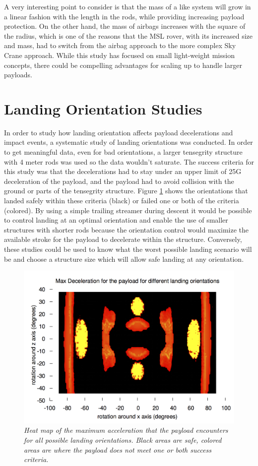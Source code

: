 A very interesting point to consider is that the mass of a \SB{} like system will grow in a linear fashion with the length in the rods, while providing increasing payload protection.  On the other hand, the mass of airbags increases with the square of the radius, which is one of the reasons that the MSL rover, with its increased size and mass, had to switch from the airbag approach to the more complex Sky Crane approach.  While this study has focused on small light-weight mission concepts, there could be compelling advantages for scaling up to handle larger payloads.

\section{Landing Orientation Studies}
In order to study how landing orientation affects payload decelerations and impact events, a systematic study of landing orientations was conducted.  In order to get meaningful data, even for bad orientations, a larger tensegrity structure with 4 meter rods was used so the data wouldn't saturate.  The success criteria for this study was that the decelerations had to stay under an upper limit of 25G deceleration of the payload, and the payload had to avoid collision with the ground or parts of the tensegrity structure.  Figure \ref{fig:landingHeatMapRot} shows the orientations that landed safely within these criteria (black) or failed one or both of the criteria (colored).  By using a simple trailing streamer during descent it would be possible to control landing at an optimal orientation and enable the use of smaller structures with shorter rods because the orientation control would maximize the available stroke for the payload to decelerate within the structure.  Conversely, these studies could be used to know what the worst possible landing scenario will be and choose a structure size which will allow safe landing at any orientation.

\begin{figure}[htbp]
   \centering
   \includegraphics[width=0.8\columnwidth]{tex/images/landing/landingHeatMapRot.png}
   \caption{\em Heat map of the maximum acceleration that the payload encounters for all possible landing orientations. Black areas are safe, colored areas are where the payload does not meet one or both success criteria.}
   \label{fig:landingHeatMapRot}
\end{figure}


